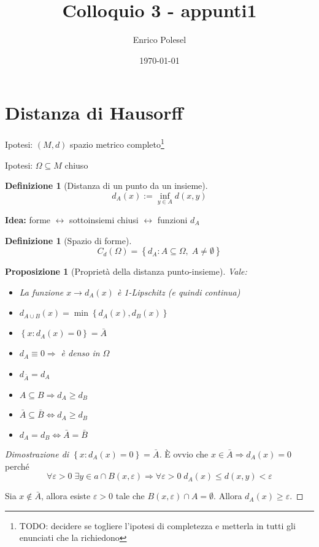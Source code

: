 \documentclass[a4paper,10pt]{article}
\title{Colloquio 3 - appunti1}
\author{Enrico Polesel}
\date{\today}
\newcounter{counter1}
\theoremstyle{plain}
\newtheorem{mypro}[counter1]{Proposizione}
\theoremstyle{definition}
\newtheorem{mydef}[counter1]{Definizione}
\theoremstyle{remark}
\newcommand{\set}[1]{\left\{#1\right\}}
\begin{document}
\maketitle

\section{Distanza di Hausorff}

Ipotesi: $(M,d)$ spazio metrico completo\footnote{TODO: decidere se
  togliere l'ipotesi di completezza e metterla in tutti gli enunciati
  che la richiedono}

Ipotesi: $\Omega \subseteq M$ chiuso

\begin{mydef}[Distanza di un punto da un insieme]
\[  d_A (x) := \inf _{y \in A} d(x,y) \] 
\end{mydef}

\textbf{Idea:} forme $\leftrightarrow$ sottoinsiemi chiusi
$\leftrightarrow$ funzioni $d_A$

\begin{mydef}[Spazio di forme]
  \[ C_d(\Omega) = \set{d_A : A \subseteq \Omega,\; A \neq \emptyset} \]
\end{mydef}

\begin{mypro}[Proprietà della distanza punto-insieme]
  Vale:
  \begin{itemize}
  \item La funzione $x \rightarrow d_A(x)$ è 1-Lipschitz (e quindi
    continua)
  \item $d_{A\cup B}(x) = \min\set{d_A(x),d_B(x)}$
  \item $\set{x:d_A(x) = 0} = \bar A$
  \item $d_A \equiv 0 \Rightarrow $ è denso in $\Omega$
  \item $d_{\bar A} = d_A$
  \item $A\subseteq B \Rightarrow d_A \ge d_B$
  \item $\bar A \subseteq \bar B \Leftrightarrow d_A \ge d_B$
  \item $d_A = d_B \Leftrightarrow \bar A = \bar B$
  \end{itemize}
\end{mypro}
\begin{proof} [Dimostrazione di $\set{x:d_A(x) = 0} = \bar A$]
  \`E ovvio che $x\in \bar A \Rightarrow d_A(x) = 0$ perché 
  \[ \forall \varepsilon > 0\; \exists y \in a \cap B(x,\varepsilon)
  \Rightarrow \forall \varepsilon > 0 \; d_A(x) \le d(x,y) <
  \varepsilon \]

  Sia $x\not\in \bar A$, allora esiste $\varepsilon>0$ tale che
  $B(x,\varepsilon) \cap A = \emptyset$. Allora $d_A(x) \ge
  \varepsilon$.
\end{proof}
\end{document}
